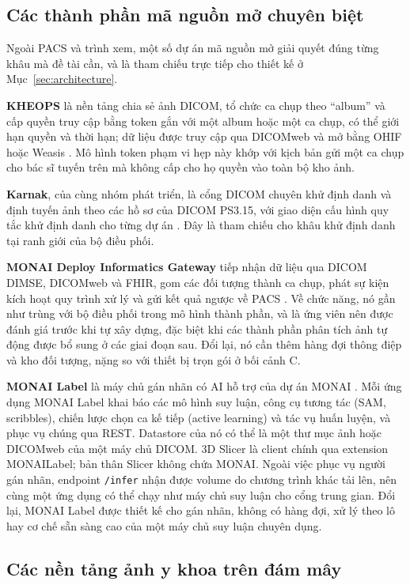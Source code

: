 \subsection{Các thành phần mã nguồn mở chuyên biệt}

Ngoài PACS và trình xem, một số dự án mã nguồn mở giải quyết đúng từng khâu mà
đề tài cần, và là tham chiếu trực tiếp cho thiết kế ở Mục~\ref{sec:architecture}.

\textbf{KHEOPS} là nền tảng chia sẻ ảnh DICOM, tổ chức ca chụp theo ``album'' và
cấp quyền truy cập bằng token gắn với một album hoặc một ca chụp, có thể giới hạn
quyền và thời hạn; dữ liệu được truy cập qua DICOMweb và mở bằng OHIF hoặc Weasis
\cite{kheops}. Mô hình token phạm vi hẹp này khớp với kịch bản gửi một ca chụp cho
bác sĩ tuyến trên mà không cấp cho họ quyền vào toàn bộ kho ảnh.

\textbf{Karnak}, của cùng nhóm phát triển, là cổng DICOM chuyên khử định danh và
định tuyến ảnh theo các hồ sơ của DICOM PS3.15, với giao diện cấu hình quy tắc khử
định danh cho từng dự án \cite{karnak}. Đây là tham chiếu cho khâu khử định danh
tại ranh giới của bộ điều phối.

\textbf{MONAI Deploy Informatics Gateway} tiếp nhận dữ liệu qua DICOM DIMSE,
DICOMweb và FHIR, gom các đối tượng thành ca chụp, phát sự kiện kích hoạt quy trình
xử lý và gửi kết quả ngược về PACS \cite{monaiig}. Về chức năng, nó gần như trùng
với bộ điều phối trong mô hình thành phần, và là ứng viên nên được đánh giá trước
khi tự xây dựng, đặc biệt khi các thành phần phân tích ảnh tự động được bổ sung ở
các giai đoạn sau. Đổi lại, nó cần thêm hàng đợi thông điệp và kho đối tượng, nặng
so với thiết bị trọn gói ở bối cảnh C.

\textbf{MONAI Label} là máy chủ gán nhãn có AI hỗ trợ của dự án MONAI \cite{monailabel}.
Mỗi ứng dụng MONAI Label khai báo các mô hình suy luận, công cụ tương tác (SAM,
scribbles), chiến lược chọn ca kế tiếp (active learning) và tác vụ huấn luyện, và phục
vụ chúng qua REST. Datastore của nó có thể là một thư mục ảnh hoặc DICOMweb của một
máy chủ DICOM. 3D Slicer là client chính qua extension MONAILabel; bản thân Slicer
không chứa MONAI. Ngoài việc phục vụ người gán nhãn, endpoint \texttt{/infer} nhận được
volume do chương trình khác tải lên, nên cùng một ứng dụng có thể chạy như máy chủ
suy luận cho cổng trung gian. Đổi lại, MONAI Label được thiết kế cho gán nhãn, không có
hàng đợi, xử lý theo lô hay cơ chế sẵn sàng cao của một máy chủ suy luận chuyên dụng.

\subsection{Các nền tảng ảnh y khoa trên đám mây}
\label{sec:cloud}


